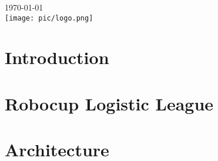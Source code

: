 \documentclass[12pt]{report}
\begin{document}
\begin{titlepage}


{\large \today}\\[2cm] %


\texttt{[image: pic/logo.png]}\\[1cm] %


\vfill %

\end{titlepage}

\tableofcontents
\listoffigures


\begin{abstract}
	
\end{abstract}

\chapter{Introduction}
	

\chapter{Robocup Logistic League}
	

\chapter{Architecture}
    
\end{document}
